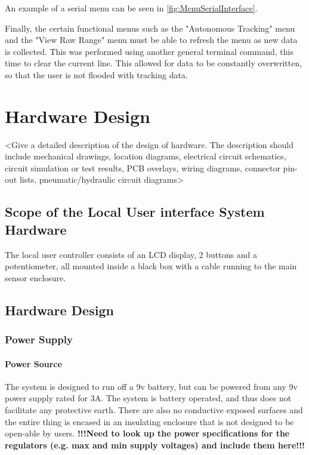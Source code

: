 \documentclass[]{report}
\begin{document}
An example of a serial menu can be seen in \ref{fig:MenuSerialInterface}.

Finally, the certain functional menus such as the "Autonomous Tracking" menu and the "View Raw Range" menu must be able to refresh the menu as new data is collected. This was performed using another general terminal command, this time to clear the current line. This allowed for data to be constantly overwritten, so that the user is not flooded with tracking data.

\chapter{Hardware Design}
<Give a detailed description of the design of hardware. The description should include mechanical drawings, location diagrams, electrical circuit schematics, circuit simulation or test results, PCB overlays, wiring diagrams, connector pin-out lists, pneumatic/hydraulic circuit diagrams>

\section{Scope of the Local User interface System Hardware}
The local user controller consists of an LCD display, 2 buttons and a potentiometer, all mounted inside a black box with a cable running to the main sensor enclosure.

\section{Hardware Design}
\subsection{Power Supply}
\subsubsection{Power Source}

The system is designed to run off a 9v battery, but can be powered from any 9v power supply rated for 3A. The system is battery operated, and thus does not facilitate any protective earth. There are also no conductive exposed surfaces and the entire thing is encased in an insulating enclosure that is not designed to be open-able by users. \newline
\textbf{!!!Need to look up the power specifications for the regulators (e.g. max and min supply voltages) and include them here!!!}
\end{document}
